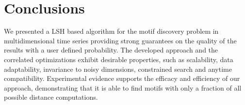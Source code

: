 
\section{Conclusions}
We presented a LSH based algorithm for the motif discovery problem in multidimensional time series providing strong guarantees on the quality of the results with a user defined probability.
The developed approach and the correlated optimizations exhibit desirable properties, such as scalability, data adaptability, invariance to noisy dimensions, constrained search and anytime compatibility.
Experimental evidence supports the efficacy and efficiency of our approach, demonstrating that it is able to find motifs with only a fraction of all possible distance computations.

